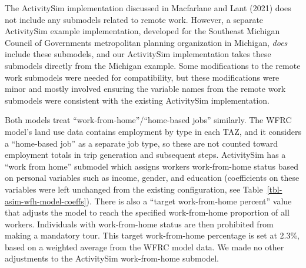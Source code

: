 \documentclass[fancy, oneside, mastersfancy, ms]{byuthesis}
\begin{document}
The ActivitySim implementation discussed in Macfarlane and Lant (2021)
does not include any submodels related to remote work. However, a
separate ActivitySim example implementation, developed for the Southeast
Michigan Council of Governments metropolitan planning organization in
Michigan, \emph{does} include these submodels, and our ActivitySim
implementation takes these submodels directly from the Michigan example.
Some modifications to the remote work submodels were needed for
compatibility, but these modifications were minor and mostly involved
ensuring the variable names from the remote work submodels were
consistent with the existing ActivitySim implementation.

Both models treat ``work-from-home''/``home-based jobs'' similarly. The
WFRC model's land use data contains employment by type in each TAZ, and
it considers a ``home-based job'' as a separate job type, so these are
not counted toward employment totals in trip generation and subsequent
steps. ActivitySim has a ``work from home'' submodel which assigns
workers work-from-home status based on personal variables such as
income, gender, and education (coefficients on these variables were left
unchanged from the existing configuration, see
Table~\ref{tbl-asim-wfh-model-coeffs}). There is also a ``target
work-from-home percent'' value that adjusts the model to reach the
specified work-from-home proportion of all workers. Individuals with
work-from-home status are then prohibited from making a mandatory tour.
This target work-from-home percentage is set at 2.3\%, based on a
weighted average from the WFRC model data. We made no other adjustments
to the ActivitySim work-from-home submodel.
\end{document}
